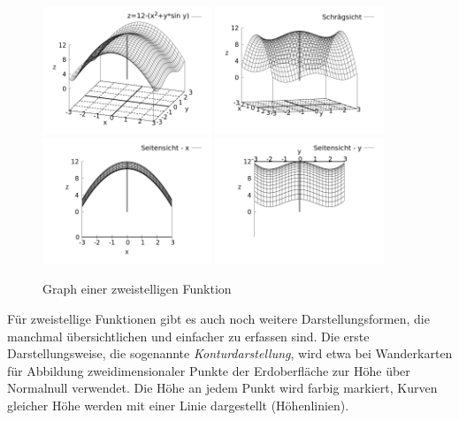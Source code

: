\begin{figure}[h]
    \caption{Graph einer zweistelligen Funktion}
    \label{fig:GraphMultivarFun}
    \centering
    \includegraphics[width=0.45\textwidth]{./gnuplot/example-multivariate-function-1.png}
    \includegraphics[width=0.45\textwidth]{./gnuplot/example-multivariate-function-2.png}
    \includegraphics[width=0.45\textwidth]{./gnuplot/example-multivariate-function-3.png}
    \includegraphics[width=0.45\textwidth]{./gnuplot/example-multivariate-function-4.png}
\end{figure}

Für zweistellige Funktionen gibt es auch noch weitere Darstellungsformen, die manchmal übersichtlichen und einfacher zu erfassen sind. Die erste Darstellungsweise, die sogenannte \emph{Konturdarstellung}, wird etwa bei Wanderkarten für Abbildung zweidimensionaler Punkte der Erdoberfläche zur Höhe über Normalnull verwendet. Die Höhe an jedem Punkt wird farbig markiert, Kurven gleicher Höhe werden mit einer Linie dargestellt (Höhenlinien).

